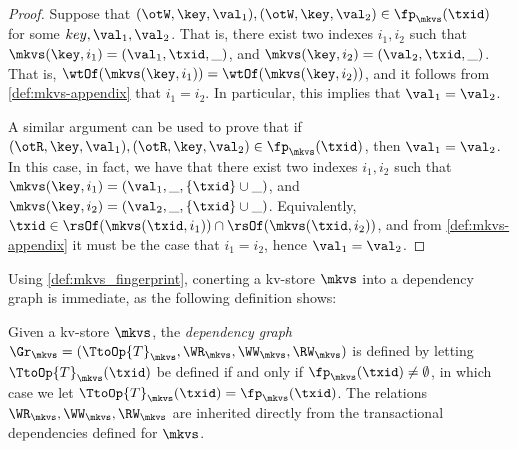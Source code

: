 \begin{proof}
Suppose that $(\otW, \key, \val_1), (\otW,\key,\val_2) \in \fp_{\mkvs}(\txid)$ for some $key, 
\val_1, \val_2$. That is, there exist two indexes $i_1, i_2$ such that 
$\mkvs(\key, i_1) = (\val_1, \txid, \_)$, and $\mkvs(\key, i_2) = (\val_2, \txid, \_)$. 
That is, $\wtOf(\mkvs(\key, i_1)) = \wtOf(\mkvs(\key, i_2))$, and it follows 
from \cref{def:mkvs-appendix} that $i_1 = i_2$. In particular, this implies that $\val_1 = \val_2$. 

A similar argument can be used to prove that if $(\otR, \key, \val_1), (\otR,\key, \val_2) \in \fp_{\mkvs}(\txid)$, 
then $\val_1 = \val_2$. In this case, in fact, we have that there exist two indexes $i_1, i_2$ such that 
$\mkvs(\key, i_1) = (\val_1, \_,\{\txid\} \cup \_)$, and $\mkvs(\key, i_2) = (\val_2, \_, \{\txid\} \cup \_)$. 
Equivalently, $\txid \in \rsOf(\mkvs(\txid, i_1)) \cap \rsOf(\mkvs(\txid, i_2))$, and from 
\cref{def:mkvs-appendix} it must be the case that $i_1 = i_2$, hence $\val_1 = \val_2$.
\end{proof}

Using \cref{def:mkvs_fingerprint}, conerting a kv-store $\mkvs$  into a dependency graph is immediate, as the following 
definition shows: 

\begin{definition}
\label{def:kv2graph}
Given a kv-store $\mkvs$, the \emph{dependency graph} $\Gr_{\mkvs} = (\TtoOp{T}_{\mkvs}, \WR_{\mkvs}, 
\WW_{\mkvs}, \RW_{\mkvs})$ is defined by letting  $\TtoOp{T}_{\mkvs}(\txid)$ be defined if and only if
$\fp_{\mkvs}(\txid) \neq \emptyset$, in which case we let $\TtoOp{T}_{\mkvs}(\txid) = \fp_{\mkvs}(\txid)$. 
The relations $\WR_{\mkvs}, \WW_{\mkvs}, \RW_{\mkvs}$ are inherited directly from the transactional 
dependencies defined for $\mkvs$.
\end{definition}

